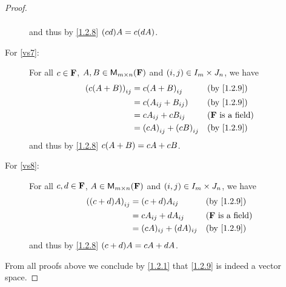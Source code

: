 \begin{proof}
\begin{description}
\begin{align*}
            \end{align*}
            and thus by \cref{1.2.8} \(\p{cd} A = c \p{dA}\).
        \item[For \ref{vs7}:]
            For all \(c \in \mathbf{F}\), \(A, B \in {\mathsf{M}_{{m} \times n}({\mathbf{F}})}\) and \(\left\lparen i, j\right\rparen \in I_{m} \times J_{n}\), we have
            \begin{align*}
                \p{c \p{A + B}}_{i j} & = c \p{A + B}_{i j}           &  & \text{(by \cref{1.2.9})}   \\
                                      & = c \p{A_{i j} + B_{i j}}     &  & \text{(by \cref{1.2.9})}   \\
                                      & = c A_{i j} + c B_{i j}       &  & \text{(\(\F\) is a field)} \\
                                      & = \p{cA}_{i j} + \p{cB}_{i j} &  & \text{(by \cref{1.2.9})}
            \end{align*}
            and thus by \cref{1.2.8} \(c \p{A + B} = cA + cB\).
        \item[For \ref{vs8}:]
            For all \(c, d \in \mathbf{F}\), \(A \in {\mathsf{M}_{{m} \times n}({\mathbf{F}})}\) and \(\left\lparen i, j\right\rparen \in I_{m} \times J_{n}\), we have
            \begin{align*}
                \p{\p{c + d} A}_{i j} & = \p{c + d} A_{i j}       &  & \text{(by \cref{1.2.9})}   \\
                                      & = c A_{i j} + d A_{i j}   &  & \text{(\(\F\) is a field)} \\
                                      & = (cA)_{i j} + (dA)_{i j} &  & \text{(by \cref{1.2.9})}
            \end{align*}
            and thus by \cref{1.2.8} \(\p{c + d} A = cA + dA\).
    \end{description}
    From all proofs above we conclude by \cref{1.2.1} that \cref{1.2.9} is indeed a vector space.
\end{proof}
